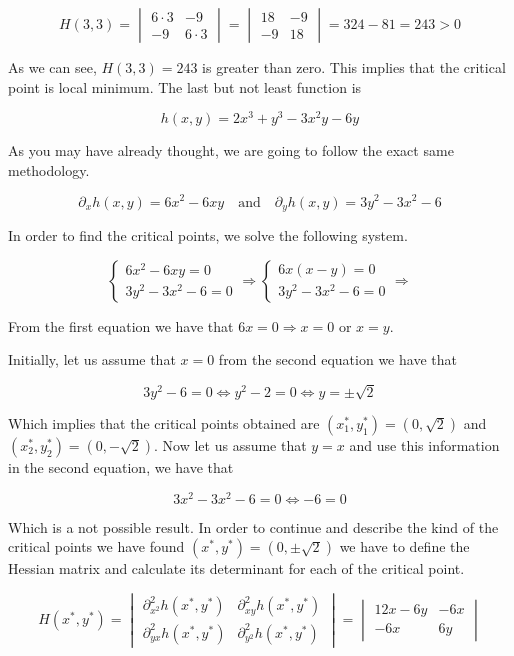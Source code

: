 \documentclass[
]{article}
\begin{document}
\[
H(3,3)=\begin{vmatrix}
6\cdot3 & -9\\
-9 & 6\cdot3
\end{vmatrix}= \begin{vmatrix}
18 & -9 \\
-9 & 18
\end{vmatrix} =324 -81 = 243 >0
\]

As we can see, \(H(3,3) = 243\) is greater than zero. This implies that
the critical point is local minimum. The last but not least function is

\[h(x,y)=2x^3+y^3-3x^2y-6y\]

As you may have already thought, we are going to follow the exact same
methodology.

\[
\partial_xh(x,y)=6x^2-6xy\quad \text{and}\quad \partial_yh(x,y)= 3y^2-3x^2-6
\]

In order to find the critical points, we solve the following system.

\[
\begin{cases}
6x^2-6xy = 0\\
3y^2-3x^2-6 = 0
\end{cases} \Rightarrow
\begin{cases}
6x(x-y)=0\\
3y^2-3x^2-6 = 0
\end{cases}\Rightarrow
\]

From the first equation we have that \(6x=0\Rightarrow x=0\) or \(x=y\).

Initially, let us assume that \(x=0\) from the second equation we have
that

\[
3y^2-6 = 0 \Leftrightarrow y^2 -2 = 0 \Leftrightarrow y =\pm\sqrt2
\]

Which implies that the critical points obtained are
\((x_1^*, y_1^*)=(0,\sqrt2)\) and \((x_2^*, y_2^*)=(0,-\sqrt2)\). Now
let us assume that \(y = x\) and use this information in the second
equation, we have that

\[
3x^2 - 3x^2 -6 =0 \Leftrightarrow -6 = 0
\]

Which is a not possible result. In order to continue and describe the
kind of the critical points we have found \((x^*, y^*)=(0,\pm\sqrt2)\)
we have to define the Hessian matrix and calculate its determinant for
each of the critical point.

\[
H(x^*,y^*)=\begin{vmatrix}
\partial^2_{x^2}h(x^*,y^*) & \partial_{xy}^2h(x^*,y^*)\\
\partial_{yx}^2h(x^*,y^*) & \partial^2_{y^2}h(x^*,y^*)
\end{vmatrix} = \begin{vmatrix}
12x-6y & -6x \\
-6x & 6y
\end{vmatrix}
\]
\end{document}
